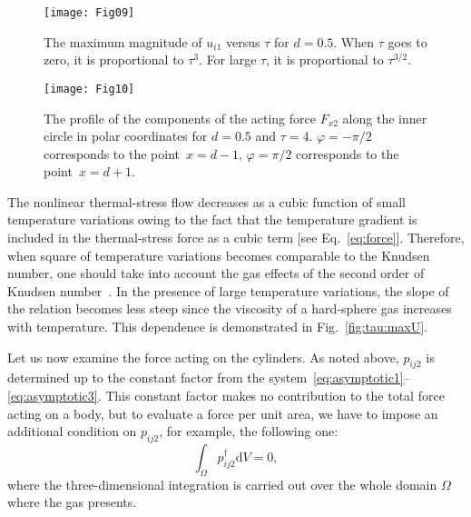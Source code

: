 \documentclass[smallextended, final]{svjour3} %
\newcommand{\dd}{\mathrm{d}}
\begin{document}
\begin{figure}[ht]
    \centering
    \begin{minipage}{.48\textwidth}
        \centering
        \texttt{[image: Fig09]}
        \caption{The maximum magnitude of \(u_{i1}\) versus \(\tau\) for \(d=0.5\).
                When \(\tau\) goes to zero, it is proportional to \(\tau^3\).
                For large \(\tau\), it is proportional to \(\tau^{3/2}\).}
        \label{fig:tau:maxU}
    \end{minipage}
    \quad
    \begin{minipage}{.48\textwidth}
        \centering
        \texttt{[image: Fig10]}
        \caption{The profile of the components of the acting force \(F_{x2}\) along
                the inner circle in polar coordinates for \(d=0.5\) and \(\tau=4\).
                \(\varphi = -\pi/2\) corresponds to the point~\(x=d-1\),
                \(\varphi = \pi/2\) corresponds to the point~\(x=d+1\).}
        \label{fig:terms:inner}
    \end{minipage}
\end{figure}

The nonlinear thermal-stress flow decreases as a cubic function of small temperature variations
owing to the fact that the temperature gradient is included in the thermal-stress force
as a cubic term [see Eq.~\eqref{eq:force}].
Therefore, when square of temperature variations becomes comparable to the Knudsen number,
one should take into account the gas effects of the second order of Knudsen number~\cite{Sone1989Noncoaxial}.
In the presence of large temperature variations,
the slope of the relation becomes less steep since the viscosity of a hard-sphere gas increases with temperature.
This dependence is demonstrated in Fig.~\ref{fig:tau:maxU}.

Let us now examine the force acting on the cylinders.
As noted above, \(p_{ij2}\) is determined up to the constant factor
from the system~\eqref{eq:asymptotic1}--\eqref{eq:asymptotic3}.
This constant factor makes no contribution to the total force acting on a body,
but to evaluate a force per unit area, we have to impose an additional condition
on \(p_{ij2}\), for example, the following one:
\begin{equation}\label{eq:dag_condition}
    \int_\Omega p^\dag_{ij2}\dd{V} = 0,
\end{equation}
where the three-dimensional integration is carried out over the whole domain \(\Omega\) where the gas presents.
\end{document}
